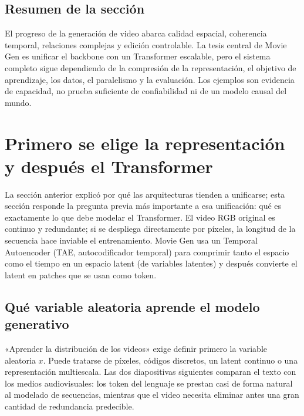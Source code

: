 \documentclass[a4paper]{article}
\begin{document}

\subsection{Resumen de la sección}

El progreso de la generación de video abarca calidad espacial, coherencia temporal, relaciones complejas y edición controlable. La tesis central de Movie Gen es unificar el backbone con un Transformer escalable, pero el sistema completo sigue dependiendo de la compresión de la representación, el objetivo de aprendizaje, los datos, el paralelismo y la evaluación. Los ejemplos son evidencia de capacidad, no prueba suficiente de confiabilidad ni de un modelo causal del mundo.
\section{Primero se elige la representación y después el Transformer}

La sección anterior explicó por qué las arquitecturas tienden a unificarse; esta sección responde la pregunta previa más importante a esa unificación: qué es exactamente lo que debe modelar el Transformer. El video RGB original es continuo y redundante; si se despliega directamente por píxeles, la longitud de la secuencia hace inviable el entrenamiento. Movie Gen usa un Temporal Autoencoder (TAE, autocodificador temporal) para comprimir tanto el espacio como el tiempo en un espacio latent (de variables latentes) y después convierte el latent en patches que se usan como token.

\subsection{Qué variable aleatoria aprende el modelo generativo}

«Aprender la distribución de los videos» exige definir primero la variable aleatoria $x$. Puede tratarse de píxeles, códigos discretos, un latent continuo o una representación multiescala. Las dos diapositivas siguientes comparan el texto con los medios audiovisuales: los token del lenguaje se prestan casi de forma natural al modelado de secuencias, mientras que el video necesita eliminar antes una gran cantidad de redundancia predecible.
\end{document}
